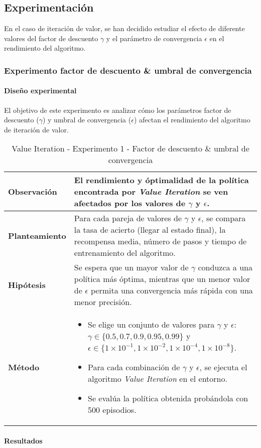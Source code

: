 \subsection{Experimentación}

En el caso de iteración de valor, se han decidido estudiar el efecto de diferente valores del factor de descuento $\gamma$ y el parámetro de convergencia $\epsilon$ en el rendimiento del algoritmo. 

\subsubsection{Experimento factor de descuento \& umbral de convergencia}

\paragraph{Diseño experimental}
El objetivo de este experimento es analizar cómo los parámetros factor de descuento (\(\gamma\)) y umbral de convergencia (\(\epsilon\)) afectan el rendimiento del algoritmo de iteración de valor.

\begin{table}[H]
    \centering
    \begin{tabularx}{\textwidth}{|p{4cm}|X|} %
        \hline %
        \textbf{Observación} & El rendimiento y óptimalidad de la política encontrada por \textit{Value Iteration} se ven afectados por los valores de $\gamma$ y $\epsilon$.
        \\ \hline
        \textbf{Planteamiento} & Para cada pareja de valores de $\gamma$ y $\epsilon$, se compara la tasa de acierto (llegar al estado final), la recompensa media, número de pasos y tiempo de entrenamiento del algoritmo.
        \\ \hline
        \textbf{Hipótesis} & Se espera que un mayor valor de $\gamma$ conduzca a una política más óptima, mientras que un menor valor de $\epsilon$ permita una convergencia más rápida con una menor precisión.
        \\ \hline
        \textbf{Método} & 
        \begin{itemize}
            \item Se elige un conjunto de valores para $\gamma$ y $\epsilon$: \(\gamma \in \{0.5, 0.7, 0.9, 0.95, 0.99\}\) y \(\epsilon \in \{1\times 10^{-1}, 1\times 10^{-2}, 1\times 10^{-4}, 1\times 10^{-8}\}\).
            \item Para cada combinación de \(\gamma\) y \(\epsilon\), se ejecuta el algoritmo \textit{Value Iteration} en el entorno.
            \item Se evalúa la política obtenida probándola con 500 episodios.
        \end{itemize}
        \\ \hline
    \end{tabularx}
    \caption{Value Iteration - Experimento 1 - Factor de descuento \& umbral de convergencia}
    \label{tab:diseñoValueIterationExp1}
\end{table}

\paragraph{Resultados}
